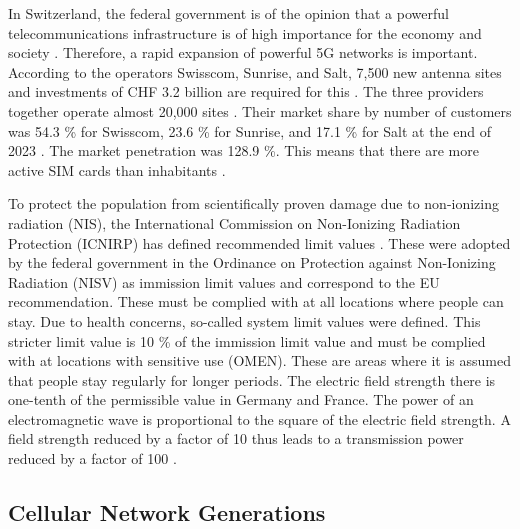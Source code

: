 \begin{English}
    In Switzerland, the federal government is of the opinion that a powerful telecommunications infrastructure is of high importance for the economy and society \cite{bundesratNachhaltigesMobilfunknetzBericht2022}. Therefore, a rapid expansion of powerful 5G networks is important. According to the operators Swisscom, Sunrise, and Salt, 7,500 new antenna sites and investments of CHF 3.2 billion are required for this \cite{bundesratNachhaltigesMobilfunknetzBericht2022}. The three providers together operate almost 20,000 sites \cite{federalofficeofcommunicationsofcomLocationsMobilePhone}. Their market share by number of customers was 54.3 \% for Swisscom, 23.6 \% for Sunrise, and 17.1 \% for Salt at the end of 2023 \cite{bakomMarktanteileMobilfunknetz}. The market penetration was 128.9 \%. This means that there are more active SIM cards than inhabitants \cite{bakomAnzahlMobilfunkkundinnenUnd}.

    To protect the population from scientifically proven damage due to non-ionizing radiation (NIS), the International Commission on Non-Ionizing Radiation Protection (ICNIRP) has defined recommended limit values \cite{baumannMitVerordnungUeber2005}. These were adopted by the federal government in the Ordinance on Protection against Non-Ionizing Radiation (NISV) as immission limit values and correspond to the EU recommendation. These must be complied with at all locations where people can stay. Due to health concerns, so-called system limit values were defined. This stricter limit value is 10 \% of the immission limit value and must be complied with at locations with sensitive use (OMEN). These are areas where it is assumed that people stay regularly for longer periods. The electric field strength there is one-tenth of the permissible value in Germany and France. The power of an electromagnetic wave is proportional to the square of the electric field strength. A field strength reduced by a factor of 10 thus leads to a transmission power reduced by a factor of 100 \cite{chance5gAnlagegrenzwerteImMobilfunk}.
\end{English}

\subsection{Cellular Network Generations}


